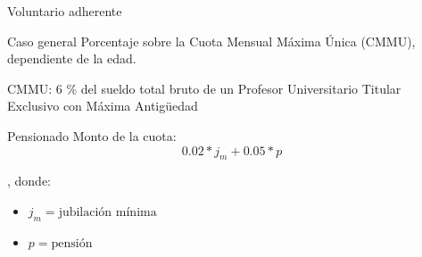 \documentclass[10pt]{beamer}
\begin{document}
\begin{frame}{Voluntario adherente}
    \begin{block}{Caso general}
        Porcentaje sobre la Cuota Mensual Máxima Única (CMMU), dependiente de la edad.

        CMMU: 6 \% del sueldo total bruto de un Profesor Universitario Titular Exclusivo con Máxima Antigüedad
    \end{block}
    \begin{block}{Pensionado}
        Monto de la cuota:
        \begin{displaymath}
        0.02 * j_m + 0.05 * p
        \end{displaymath}

        , donde:
        \begin{itemize}
            \item $j_m = \text{jubilación mínima}$
            \item $p = \text{pensión}$
        \end{itemize}
    \end{block}
\end{frame}

\end{document}
